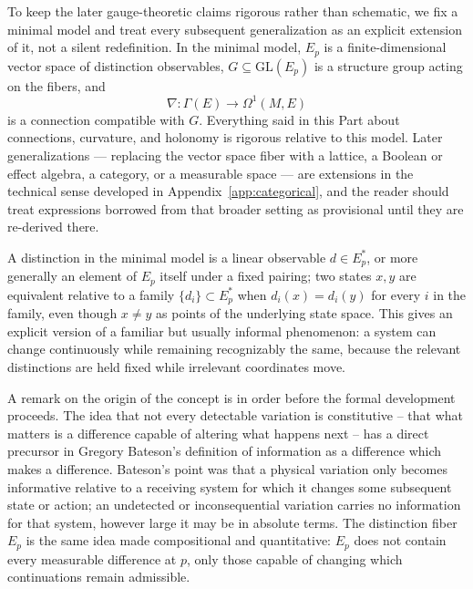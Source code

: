 \documentclass[11pt]{article}
\begin{document}
To keep the later gauge-theoretic claims rigorous rather than schematic, we fix a minimal model and treat every subsequent generalization as an explicit extension of it, not a silent redefinition. In the minimal model, $E_p$ is a finite-dimensional vector space of distinction observables, $G \subseteq \mathrm{GL}(E_p)$ is a structure group acting on the fibers, and
\[
\nabla : \Gamma(E) \rightarrow \Omega^1(M, E)
\]
is a connection compatible with $G$. Everything said in this Part about connections, curvature, and holonomy is rigorous relative to this model. Later generalizations — replacing the vector space fiber with a lattice, a Boolean or effect algebra, a category, or a measurable space — are extensions in the technical sense developed in Appendix~\ref{app:categorical}, and the reader should treat expressions borrowed from that broader setting as provisional until they are re-derived there.

A distinction in the minimal model is a linear observable $d \in E_p^\ast$, or more generally an element of $E_p$ itself under a fixed pairing; two states $x, y$ are equivalent relative to a family $\{d_i\} \subset E_p^\ast$ when $d_i(x) = d_i(y)$ for every $i$ in the family, even though $x \neq y$ as points of the underlying state space. This gives an explicit version of a familiar but usually informal phenomenon: a system can change continuously while remaining recognizably the same, because the relevant distinctions are held fixed while irrelevant coordinates move.

A remark on the origin of the concept is in order before the formal development proceeds. The idea that not every detectable variation is constitutive -- that what matters is a difference capable of altering what happens next -- has a direct precursor in Gregory Bateson's definition of information as a difference which makes a difference. Bateson's point was that a physical variation only becomes informative relative to a receiving system for which it changes some subsequent state or action; an undetected or inconsequential variation carries no information for that system, however large it may be in absolute terms. The distinction fiber $E_p$ is the same idea made compositional and quantitative: $E_p$ does not contain every measurable difference at $p$, only those capable of changing which continuations remain admissible.
\end{document}
